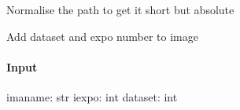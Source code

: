 \documentclass[letterpaper,10pt,english]{sphinxmanual}
\begin{document}
\begin{fulllineitems}
\label{\detokenize{api/pymusepipe:pymusepipe.util_pipe.abspath}}
\pysigstartsignatures
{}
\pysigstopsignatures
\sphinxAtStartPar
Normalise the path to get it short but absolute

\end{fulllineitems}


\begin{fulllineitems}
\label{\detokenize{api/pymusepipe:pymusepipe.util_pipe.add_key_dataset_expo}}
\pysigstartsignatures
{}
\pysigstopsignatures
\sphinxAtStartPar
Add dataset and expo number to image


\paragraph{Input}
\label{\detokenize{api/pymusepipe:id157}}
\sphinxAtStartPar
imaname: str
iexpo: int
dataset: int

\end{fulllineitems}

\end{document}
